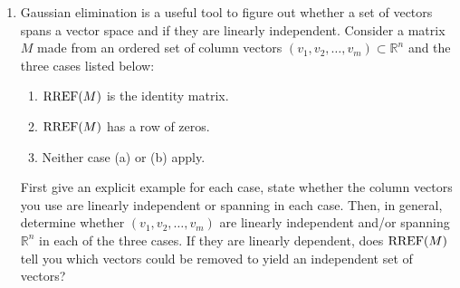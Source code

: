 \begin{enumerate}
\item
Gaussian elimination is a useful tool to figure out whether a set of vectors spans a vector space and if they are linearly independent.
Consider a matrix $M$ made from an ordered set of column vectors $(v_1,v_2,\ldots,v_m)\subset {\mathbb R}^n$ and the three cases listed below:
\begin{enumerate}
\item ${\rm RREF}(M)$ is the identity matrix.
\item ${\rm RREF}(M)$ has a row of zeros.
\item Neither case (a)  or (b) apply.
\end{enumerate}
First give an explicit example for each case,
state whether the column vectors you use are linearly independent or spanning in each case.
 Then, in general, determine whether $(v_1,v_2,\ldots,v_m)$ are linearly independent and/or spanning ${\mathbb R}^n$
 in each of the three cases. If they are linearly dependent, does ${\rm RREF}(M)$ tell you which vectors could be 
 removed to yield an independent set of vectors?
\end{enumerate}


